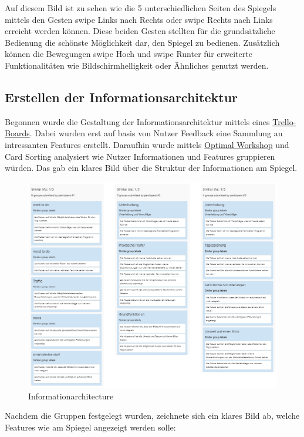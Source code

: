 \documentclass[12pt, a4paper]{scrartcl}
\begin{document}
	Auf diesem Bild ist zu sehen wie die 5 unterschiedlichen Seiten des Spiegels mittels den Gesten swipe Links nach Rechts oder swipe Rechts nach Links erreicht werden können.
	Diese beiden Gesten stellten für die grundsätzliche Bedienung die schönste Möglichkeit dar, den Spiegel zu bedienen. Zusätzlich können die Bewegungen swipe Hoch und swipe Runter für erweiterte Funktionalitäten wie Bildschirmhelligkeit oder Ähnliches genutzt werden.
	
	\subsection{Erstellen der Informationsarchitektur}
	Begonnen wurde die Gestaltung der Informationsarchitektur mittels eines \href{https://trello.com/b/hdf8bWp2/sippin-on-my-lean-ux}{Trello-Boards}. Dabei wurden erst auf basis von Nutzer Feedback eine Sammlung an intressanten Features erstellt. Daraufhin wurde mittels \href{https://www.optimalworkshop.com/optimalsort/}{Optimal Workshop} und Card Sorting analysiert wie Nutzer Informationen und Features gruppieren würden. Das gab ein klares Bild über die Struktur der Informationen am Spiegel.
	\begin{figure}[h!]
		\centering
		\includegraphics[width=\textwidth]{img/IA.png}
		\captionsetup{labelformat=empty}
		\caption{Informationarchitecture}
	\end{figure}
	\newpage
	Nachdem die Gruppen festgelegt wurden, zeichnete sich ein klares Bild ab, welche Features wie am Spiegel angezeigt werden solle:
\end{document}
